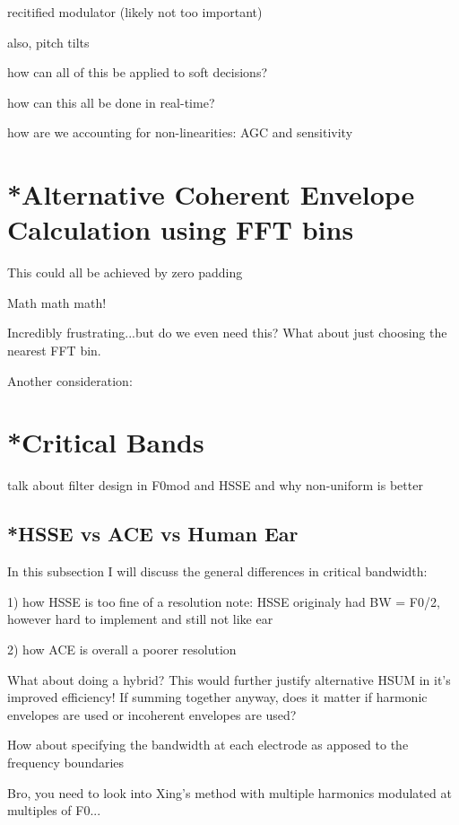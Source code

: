 \documentclass [11pt, proquest] {uwthesis}[2015/03/03]
\begin{document}
recitified modulator (likely not too important)

also, pitch tilts

how can all of this be applied to soft decisions?

how can this all be done in real-time?

how are we accounting for non-linearities: AGC and sensitivity




\section{*Alternative Coherent Envelope Calculation using FFT bins}

This could all be achieved by zero padding

Math math math!

Incredibly frustrating...but do we even need this?  What about just choosing the nearest FFT bin.

Another consideration: 

\section{*Critical Bands}

talk about filter design in F0mod and HSSE and why non-uniform is better

\subsection{*HSSE vs ACE vs Human Ear}

In this subsection I will discuss the general differences in critical bandwidth:

1) how HSSE is too fine of a resolution
note: HSSE originaly had BW = F0/2, however hard to implement and still not like ear

2) how ACE is overall a poorer resolution

What about doing a hybrid?  This would further justify alternative HSUM in it's improved efficiency!  If summing together anyway, does it matter if harmonic envelopes are used or incoherent envelopes are used?

How about specifying the bandwidth at each electrode as apposed to the frequency boundaries

Bro, you need to look into Xing's method with multiple harmonics modulated at multiples of F0...
\end{document}
